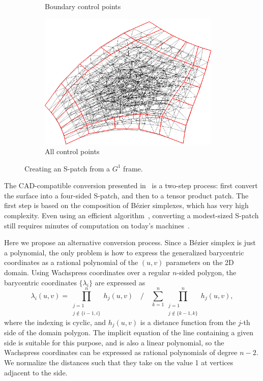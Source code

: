 \documentclass[9pt,academicons]{article}
\begin{document}
\begin{figure}[h!]
{\begin{subfigure}{0.3\textwidth}
      \caption{Boundary control points}
      \label{fig:spatch-cnet-ribbon}
    \end{subfigure}
    \hfill
    \begin{subfigure}{0.3\textwidth}
      \centering
      \includegraphics[width = 0.95\textwidth]{images/5-5-cnet-full.png}
      \caption{All control points}
      \label{fig:spatch-cnet-full}
    \end{subfigure}
  }
  \caption{Creating an S-patch from a $G^1$ frame.}
  \label{fig:spatch}
\end{figure}

The CAD-compatible conversion presented in~\cite{Loop:1989} is a two-step process:
first convert the surface into a
four-sided S-patch, and then to a tensor product patch. The first step is based on the
composition of B\'ezier simplexes, which has very high complexity.
Even using an efficient algorithm~\cite{DeRose:1993}, converting a modest-sized S-patch
still requires minutes of computation on today's machines~\cite{Salvi:2019:WAIT}.

Here we propose an alternative conversion process. Since a B\'ezier simplex is just a polynomial,
the only problem is how to express the generalized barycentric coordinates as a rational polynomial
of the $(u,v)$ parameters on the 2D domain. Using Wachspress coordinates over a regular $n$-sided
polygon, the barycentric coordinates $\{\lambda_i\}$ are expressed as
\begin{equation}
  \label{eq:wachspress}
  \lambda_i(u,v) = \prod_{\substack{j=1\\j\notin\{i-1,i\}}}^nh_j(u,v) \quad\bigg/\quad
                   \sum_{k=1}^n\prod_{\substack{j=1\\j\notin\{k-1,k\}}}^nh_j(u,v),
\end{equation}
where the indexing is cyclic, and $h_j(u,v)$ is a distance function
from the $j$-th side of the domain polygon. The implicit
equation of the line containing a given side is suitable for this purpose,
and is also a linear polynomial,
so the Wachspress coordinates can be expressed as rational polynomials of degree $n-2$. We
normalize the distances such that they take on the value 1 at vertices adjacent to the side.
\end{document}

